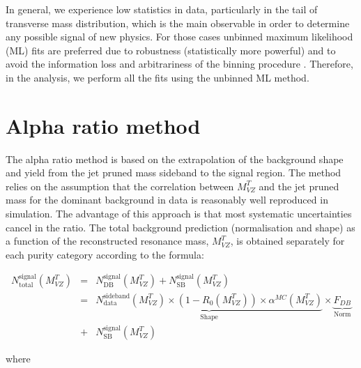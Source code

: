 In general, we experience low statistics in data, particularly in the tail of transverse mass distribution, which is the main observable in order to determine any possible signal of new physics. For those cases unbinned maximum likelihood (ML) fits are preferred due to robustness (statistically more powerful) and to avoid the information loss and arbitrariness of the binning procedure \cite{Verkerke:2003ir}. Therefore, in the analysis, we perform all the fits using the unbinned ML method.

\section{Alpha ratio method}\label{alpha}

The alpha ratio method is based on the extrapolation of the background shape and yield from the jet pruned mass sideband to the signal region. The method relies on the assumption that the correlation between $M_{VZ}^{T}$ and the  jet pruned mass for the dominant background in data is reasonably well reproduced in simulation. The advantage of this approach is that most systematic uncertainties cancel in the ratio.
The total background prediction (normalisation and shape) as a function of the reconstructed resonance mass, $M_{VZ}^{T}$, is obtained separately for each purity category according to the formula:

\begin{eqnarray}
N_{\text{total}}^{\text{signal}}(M_{VZ}^{T}) &=& N_{\text{DB}}^{\text{signal}}(M_{VZ}^{T}) + N_{\text{SB}}^{\text{signal}}(M_{VZ}^{T})\\
                                        &=& \underbrace{N_{\text{data}}^{\text{sideband}}(M_{VZ}^{T}) \times (1-R_{0}(M_{VZ}^{T}))\times \alpha^{MC}(M_{VZ}^{T})}_{\text{Shape}}\times \underbrace{F_{DB}}_{\text{Norm}} \nonumber  \\                                        &+& N_{\text{SB}}^{\text{signal}}(M_{VZ}^{T})  \nonumber
\end{eqnarray}

where

